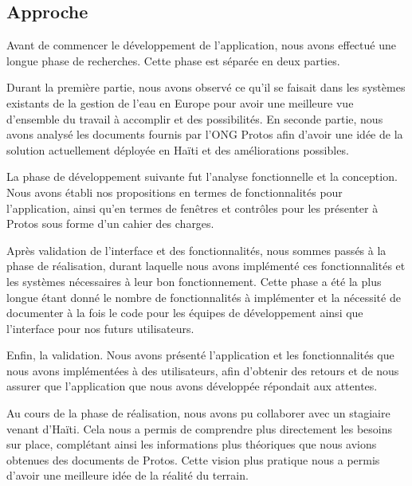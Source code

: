 \documentclass{EPL-master-thesis-covers-FR}
\begin{document}
		\subsection*{Approche}

			Avant de commencer le développement de l'application, nous avons effectué une longue phase de recherches. Cette phase est séparée en deux parties.

			Durant la première partie, nous avons observé ce qu'il se faisait dans les systèmes existants de la gestion de l'eau en Europe pour avoir une meilleure vue d'ensemble du travail à accomplir et des possibilités. En seconde partie, nous avons analysé les documents fournis par l'ONG Protos afin d'avoir une idée de la solution actuellement déployée en Haïti et des améliorations possibles.

			La phase de développement suivante fut l'analyse fonctionnelle et la conception. Nous avons établi nos propositions en termes de fonctionnalités pour l'application, ainsi qu'en termes de fenêtres et contrôles pour les présenter à Protos sous forme d'un cahier des charges.

			Après validation de l'interface et des fonctionnalités, nous sommes passés à la phase de réalisation, durant laquelle nous avons implémenté ces fonctionnalités et les systèmes nécessaires à leur bon fonctionnement. Cette phase a été la plus longue étant donné le nombre de fonctionnalités à implémenter et la nécessité de documenter à la fois le code pour les équipes de développement ainsi que l'interface pour nos futurs utilisateurs.

			Enfin, la validation. Nous avons présenté l'application et les fonctionnalités que nous avons implémentées à des utilisateurs, afin d'obtenir des retours et de nous assurer que l'application que nous avons développée répondait aux attentes. %

			Au cours de la phase de réalisation, nous avons pu collaborer avec un stagiaire venant d'Haïti. Cela nous a permis de comprendre plus directement les besoins sur place, complétant ainsi les informations plus théoriques que nous avions obtenues des documents de Protos. Cette vision plus pratique nous a permis d'avoir une meilleure idée de la réalité du terrain.
\end{document}

